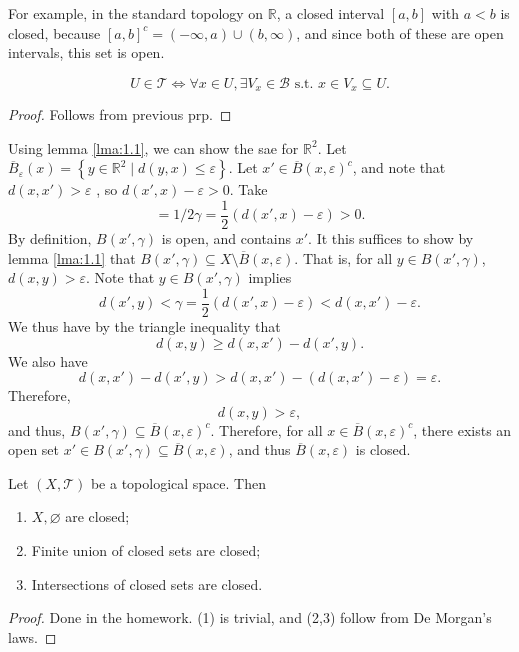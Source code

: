 For example, in the standard topology on $\mathbb{R} $, a closed interval $[a,b]$ with $a<b$ is closed, because $[a,b]^{c} =(-\infty ,a)\cup (b,\infty )$, and since both of these are open intervals, this set is open.

\begin{lemma}\label{lma:1.1}
	\[
		U\in \mathcal{T} \iff \forall x\in U,\exists V_x\in \mathcal{B} \text{ s.t. } x\in V_x\subseteq U
	.\]
\end{lemma}
\begin{proof}
	Follows from previous prp.
\end{proof}


Using lemma \ref{lma:1.1}, we can show the sae for $\mathbb{R} ^2$. Let $\overline{B} _{\varepsilon } \left( x \right ) =\left\{ y\in\mathbb{R} ^2\mid d(y,x)\leq \varepsilon  \right\}$. Let $x'\in \overline{B}(x,\varepsilon )^{c} $, and note that $d(x,x')>\varepsilon $	, so $d(x',x)-\varepsilon >0$. Take
\[ = 1/2
	\gamma = \frac{1}{2}( d(x',x)-\varepsilon )>0
.\]
By definition, $B(x',\gamma )$ is open, and contains $x'$. It this suffices to show by lemma \ref{lma:1.1} that $B(x',\gamma )\subseteq X\setminus \overline{B} (x,\varepsilon )$. That is, for all $y\in B(x',\gamma )$, $d(x,y)>\varepsilon $. Note that $y\in B(x',\gamma )$ implies
\[
	d(x',y)<\gamma  = \frac{1}{2}\left( d(x',x)-\varepsilon  \right ) <d(x,x')-\varepsilon 
.\]
We thus have by the triangle inequality that
\[
	d(x,y)\geq d(x,x')-d(x',y)
.\]
We also have
\[
	d(x,x')-d(x',y)>d(x,x')-\left( d(x,x')-\varepsilon  \right ) =\varepsilon 
.\]
Therefore,
\[
	d(x,y)>\varepsilon 
,\]
and thus, $B(x',\gamma )\subseteq \overline{B} (x,\varepsilon )^{c} $. Therefore, for all $x\in \overline{B} (x,\varepsilon )^{c} $, there exists an open set $x'\in B(x',\gamma )\subseteq \overline{B} (x,\varepsilon )$, and thus $\overline{B} (x,\varepsilon )$ is closed.

\begin{proposition}\label{prp:1.3}
	Let $(X,\mathcal{T} )$ be a topological space. Then
	\begin{enumerate}
		\item $X,\varnothing $ are closed;
		\item Finite union of closed sets are closed;
		\item Intersections of closed sets are closed.
	\end{enumerate}
\end{proposition}
\begin{proof}
	Done in the homework. (1) is trivial, and (2,3) follow from De Morgan's laws.
\end{proof}

